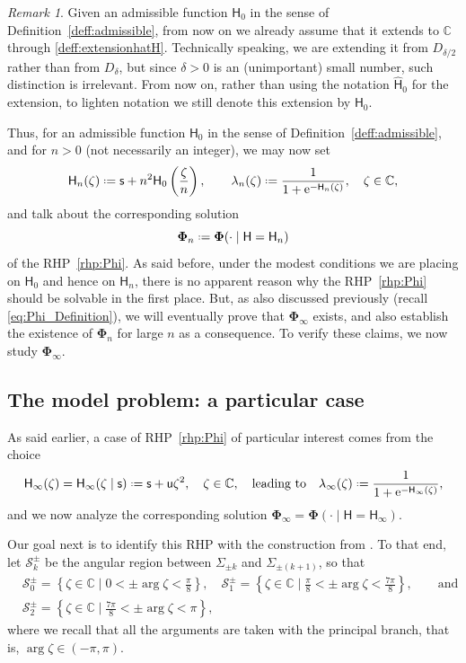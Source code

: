 \documentclass[reqno,a4paper,11pt]{amsart}
\DeclareMathOperator{\ee}{\rm e}
\newcommand{\C}{\mathbb{C}}
\newcommand*{\deff}{\mathrel{\vcenter{\baselineskip0.5ex \lineskiplimit0pt
                     \hbox{\scriptsize.}\hbox{\scriptsize.}}}%
                     =}
\renewcommand{\bm}{\mathbf}
\newcommand{\mcal}{\mathcal}
\newcommand{\msf}{\mathsf}
\newcommand{\wh}{\widehat}
\newcommand{\sad}{\msf s}
\newcommand{\uad}{\msf u}
\theoremstyle{definition}
\theoremstyle{remark}
\newtheorem{remark}[theorem]{Remark}
\numberwithin{equation}{section}
\newcommand*{\defeq}{\mathrel{\vcenter{\baselineskip0.5ex \lineskiplimit0pt
                     \hbox{\scriptsize.}\hbox{\scriptsize.}}}%
                     =}
\begin{document}
\begin{remark}
     Given an admissible function $\msf H_0$ in the sense of Definition~\ref{deff:admissible}, from now on we already assume that it extends to $\C$ through \eqref{deff:extensionhatH}. Technically speaking, we are extending it from $D_{\delta/2}$ rather than from $D_\delta$, but since $\delta>0$ is an (unimportant) small number, such distinction is irrelevant. From now on, rather than using the notation $\wh{\msf H}_0$ for the extension, to lighten notation we still denote this extension by $\msf H_0$.
\end{remark}

Thus, for an admissible function $\msf H_0$ in the sense of Definition~\ref{deff:admissible}, and for $n> 0$ (not necessarily an integer), we may now set
%
$$
\msf H_n(\zeta)\deff \sad +n^2\msf H_0\left( \frac{\zeta}{n} \right),\quad  
%
\quad \lambda_n(\zeta) \defeq \frac{1}{1 + \ee^{- \msf H_n(\zeta)}}, \quad \zeta\in \C,
$$
%
and talk about the corresponding solution
%
$$
\bm \Phi_n\deff \bm\Phi(\cdot\mid \msf H=\msf H_n)
$$
%
of the RHP~\ref{rhp:Phi}. As said before, under the modest conditions we are placing on $\msf H_0$ and hence on $\msf H_n$, there is no apparent reason why the RHP~\ref{rhp:Phi} should be solvable in the first place. But, as also discussed previously (recall \eqref{eq:Phi_Definition}), we will eventually prove that $\bm \Phi_\infty$ exists, and also establish the existence of $\bm\Phi_n$ for large $n$ as a consequence. To verify these claims, we now study $\bm\Phi_\infty$.

\subsection{The model problem: a particular case}\label{sec:modelprob_particularcase}\hfill 


As said earlier, a case of RHP~\ref{rhp:Phi} of particular interest comes from the choice
%
\begin{equation}\label{deff:hinfty}
\msf H_\infty(\zeta)=\msf H_\infty(\zeta\mid \sad)\deff \sad +\uad \zeta^2,\quad \zeta \in \C, \quad \text{leading to}\quad \lambda_\infty(\zeta)\deff \frac{1}{1+\ee^{-\msf H_\infty(\zeta)}},
\end{equation}
%
and we now analyze the corresponding solution $\bm \Phi_\infty=\bm\Phi(\cdot\mid \msf H=\msf H_\infty)$.

Our goal next is to identify this RHP with the construction from \cite{ClaeysTarricone24}. To that end, let $\mcal S^\pm_k$ be the angular region between $\Sigma_{\pm k}$ and $\Sigma_{\pm (k+1)}$, so that 
%
\begin{align*}
& \mcal S_0^\pm= \left\{\zeta\in \C \mid 0<\pm \arg \zeta < \frac{\pi}{8} \right\},\quad \mcal S_1^\pm= \left\{\zeta\in \C \mid \frac{\pi}{8}<\pm \arg \zeta < \frac{7\pi}{8} \right\}, \qquad \text{and}\\
%
& \mcal S_2^\pm = \left\{\zeta\in \C \mid \frac{7\pi}{8}<\pm \arg\zeta <\pi \right\},
\end{align*}
%
where we recall that all the arguments are taken with the principal branch, that is, $\arg\zeta\in (-\pi,\pi)$.
\end{document}
